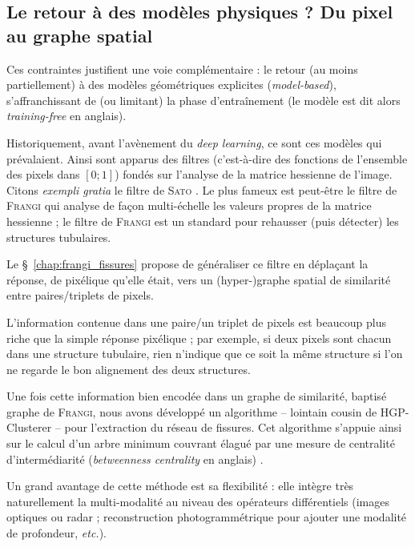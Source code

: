 \subsection{Le retour à des modèles physiques ? Du pixel au graphe spatial}

Ces contraintes justifient une voie complémentaire : le retour (au moins partiellement) à des modèles géométriques explicites (\emph{model-based}), s'affranchissant de (ou limitant) la phase d'entraînement (le modèle est dit alors \emph{training-free} en anglais). 

Historiquement, avant l'avènement du \emph{deep learning}, ce sont ces modèles qui prévalaient.
Ainsi sont apparus des filtres (c'est-à-dire des fonctions de l'ensemble des pixels dans $[ 0 ; 1]$) fondés sur l'analyse de la matrice hessienne de l'image.
Citons \emph{exempli gratia} le filtre de \textsc{Sato} \cite{Sato1998}. Le plus fameux est peut-être le filtre de \textsc{Frangi} \cite{Frangi1998} qui analyse de façon multi-échelle les valeurs propres de la matrice hessienne ; le filtre de \textsc{Frangi} est un standard pour rehausser (puis détecter) les structures tubulaires. 

Le \S~\ref{chap:frangi_fissures} propose de généraliser ce filtre en déplaçant la réponse, de pixélique qu'elle était, vers un (hyper-)graphe spatial de similarité entre paires/triplets de pixels. 

L'information contenue dans une paire/un triplet de pixels est beaucoup plus riche que la simple réponse pixélique ; par exemple, si deux pixels sont chacun dans une structure tubulaire, rien n'indique que ce soit la même structure si l'on ne regarde le bon alignement des deux structures.

Une fois cette information bien encodée dans un graphe de similarité, baptisé graphe de \textsc{Frangi}, nous avons développé un algorithme -- lointain cousin de HGP-Clusterer -- pour l'extraction du réseau de fissures. 
Cet algorithme s'appuie ainsi sur le calcul d'un arbre minimum couvrant élagué par une mesure de centralité d'intermédiarité (\emph{betweenness centrality} en anglais) \cite{Freeman1977, AvrachenkovDreveton2022}. 

Un grand avantage de cette méthode est sa flexibilité : elle intègre très naturellement la multi-modalité au niveau des opérateurs différentiels (images optiques ou radar ; reconstruction  photogrammétrique pour ajouter une modalité de profondeur, \emph{etc.}).



